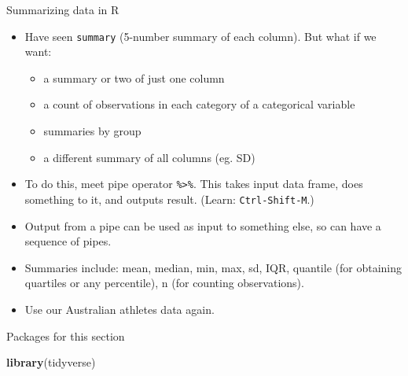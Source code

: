 \documentclass[ignorenonframetext,]{beamer}
\newenvironment{Shaded}{\begin{snugshade}}{\end{snugshade}}
\newcommand{\KeywordTok}[1]{\textcolor[rgb]{0.13,0.29,0.53}{\textbf{#1}}}
\newcommand{\NormalTok}[1]{#1}
\providecommand{\tightlist}{%
  \setlength{\itemsep}{0pt}\setlength{\parskip}{0pt}}
\begin{document}
\begin{frame}[fragile]{Summarizing data in R}
\protect\hypertarget{summarizing-data-in-r}{}

\begin{itemize}
\tightlist
\item
  Have seen \texttt{summary} (5-number summary of each column). But what
  if we want:

  \begin{itemize}
  \tightlist
  \item
    a summary or two of just one column
  \item
    a count of observations in each category of a categorical variable
  \item
    summaries by group
  \item
    a different summary of all columns (eg. SD)
  \end{itemize}
\item
  To do this, meet pipe operator \texttt{\%\textgreater{}\%}. This takes
  input data frame, does something to it, and outputs result. (Learn:
  \texttt{Ctrl-Shift-M}.)
\item
  Output from a pipe can be used as input to something else, so can have
  a sequence of pipes.
\item
  Summaries include: mean, median, min, max, sd, IQR, quantile (for
  obtaining quartiles or any percentile), n (for counting observations).
\item
  Use our Australian athletes data again.
\end{itemize}

\end{frame}

\begin{frame}[fragile]{Packages for this section}
\protect\hypertarget{packages-for-this-section-2}{}

\begin{Shaded}
\begin{Highlighting}[]
\KeywordTok{library}\NormalTok{(tidyverse)}
\end{Highlighting}
\end{Shaded}

\end{frame}
\end{document}

